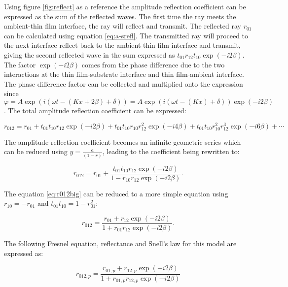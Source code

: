 \documentclass[MasterThesisMain.tex]{subfiles}
\begin{document}
Using figure \ref{fig:reflect} as a reference the amplitude reflection coefficient can be expressed as the sum of the reflected waves. The first time the ray meets the ambient-thin film interface, the ray will reflect and transmit. The reflected ray $r_{01}$ can be calculated using equation \ref{eq:a-srefl}. The transmitted ray will proceed to the next interface reflect back to the ambient-thin film interface and transmit, giving the second reflected wave in the sum expressed as $t_{01}r_{12}t_{10}\exp(-i2\beta)$. The factor $\exp(-i2\beta)$ comes from the phase difference due to the two interactions at the thin film-substrate interface and thin film-ambient interface. The phase difference factor can be collected and multiplied onto the expression since  $\varphi = A\exp(i(\omega t-(Kx+2\beta)+\delta))=A\exp(i(\omega t-(Kx)+\delta))\exp(-i2\beta)$. The total amplitude reflection coefficient can be expressed:

\begin{equation}
r_{012} = r_{01} + t_{01}t_{10}r_{12}\exp(-i2\beta) + t_{01}t_{10}r_{10}r_{12}^2\exp(-i4\beta)+ t_{01}t_{10}r_{10}^2r_{12}^3\exp(-i6\beta)+ \cdots
\end{equation}  

The amplitude reflection coefficient becomes an infinite geometric series which can be reduced using $y=\frac{a}{(1-r)}$, leading to the coefficient being rewritten to:

\begin{equation} \label{eq:r012big}
r_{012}=r_{01}+\frac{t_{01}t_{10}r_{12}\exp(-i2\beta)}{1-r_{10}r_{12}\exp(-i2\beta)}.
\end{equation}

The equation \ref{eq:r012big} can be reduced to a more simple equation using $r_{10}=-r_{01}$ and $t_{01}t_{10}=1-r_{01}^2$:

\begin{equation}\label{eq:2layerreflect}
r_{012}= \frac{r_{01}+r_{12}\exp(-i2\beta)}{1+r_{01}r_{12}\exp(-i2\beta)}.
\end{equation} 

The following Fresnel equation, reflectance and Snell's law for this model are expressed as:

\begin{equation}
r_{012,p} = \frac{r_{01,p}+r_{12,p}\exp(-i2\beta)}{1+r_{01,p}r_{12,p}\exp(-i2\beta)} %
\end{equation}
\end{document}
